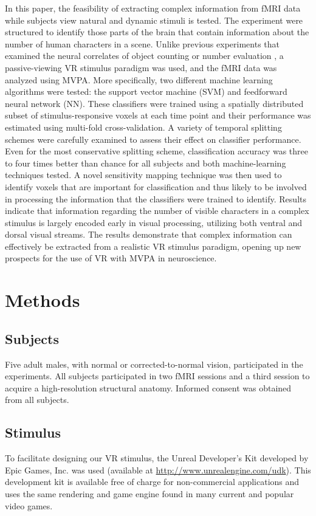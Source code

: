\documentclass[review,1p,authoryear]{elsarticle}
\begin{document}
In this paper, the feasibility of extracting complex information from fMRI data while subjects view natural and dynamic stimuli is tested.
The experiment were structured to identify those parts of the brain that contain information about the number of human characters in a scene.
Unlike previous experiments that examined the neural correlates of object counting or number evaluation \citep{Dehaene1999,Rickard2000,Barth2006}, a passive-viewing VR stimulus paradigm was used, and the fMRI data was analyzed using MVPA.
More specifically, two different machine learning algorithms were tested: the support vector machine (SVM) and feedforward neural network (NN).
These classifiers were trained using a spatially distributed subset of stimulus-responsive voxels at each time point and their performance was estimated using multi-fold cross-validation. 
A variety of temporal splitting schemes were carefully examined to assess their effect on classifier performance.
Even for the most conservative splitting scheme, classification accuracy was three to four times better than chance for all subjects and both machine-learning techniques tested.
A novel sensitivity mapping technique was then used to identify voxels that are important for classification and thus likely to be involved in processing the information that the classifiers were trained to identify.
Results indicate that information regarding  the number of visible characters in a complex stimulus is largely encoded early in visual processing, utilizing both ventral and dorsal visual streams.
The results demonstrate that complex information can effectively be extracted from a realistic VR stimulus paradigm, opening up new prospects for the use of VR with MVPA in neuroscience.

\section{Methods}

\subsection{Subjects}
Five adult males, with normal or corrected-to-normal vision, participated in the experiments. 
All subjects participated in two fMRI sessions and a third session to acquire a high-resolution structural anatomy. 
Informed consent was obtained from all subjects.

\subsection{Stimulus}
To facilitate designing our VR stimulus, the Unreal Developer's Kit developed by Epic Games, Inc. was used (available at \url{http://www.unrealengine.com/udk}).
This development kit is available free of charge for non-commercial applications and uses the same rendering and game engine found in many current and popular video games.
\end{document}
